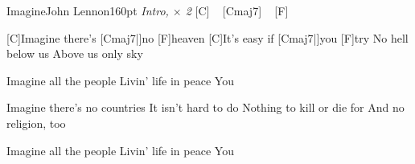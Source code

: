 \begin{song}{Imagine}{John Lennon}{160pt}
\emph{Intro, $\times$ 2}
[C] ~ [Cmaj7] ~ [F] ~

%
[C]Imagine there's [Cmaj7|]{no} [F]heaven
[C]It's easy if [Cmaj7|]{you} [F]try
No hell below us
Above us only sky

\chorus%
Imagine all the people
Livin' life in peace
You

%
Imagine there's no countries
It isn't hard to do
Nothing to kill or die for
And no religion, too

\chorus%
Imagine all the people
Livin' life in peace
You
\end{song}
